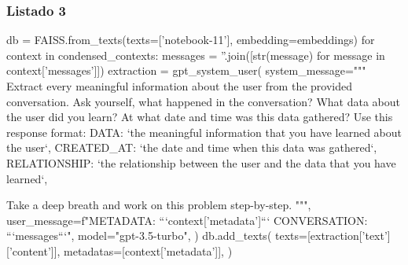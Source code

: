 
\subsubsection{Listado 3}
\label{anexo:code-4-1-11-3}

\begin{APACode}
db = FAISS.from_texts(texts=['notebook-11'], embedding=embeddings)
for context in condensed_contexts:
    messages = ''.join([str(message) for message in context['messages']])
    extraction = gpt_system_user(
        system_message="""
Extract every meaningful information about the user from the provided conversation.
Ask yourself, what happened in the conversation?
What data about the user did you learn?
At what date and time was this data gathered? Use this response format:
{
    DATA: `the meaningful information that you have learned about the user`,
    CREATED_AT: `the date and time when this data was gathered`,
    RELATIONSHIP: `the relationship between the user and the data that you have learned`,
}

Take a deep breath and work on this problem step-by-step.
        """,
        user_message=f"METADATA: ```{context['metadata']}``` CONVERSATION: ```{messages}```",
        model="gpt-3.5-turbo",
    )
    db.add_texts(
        texts=[extraction['text']['content']],
        metadatas=[context['metadata']],
    )
\end{APACode}

